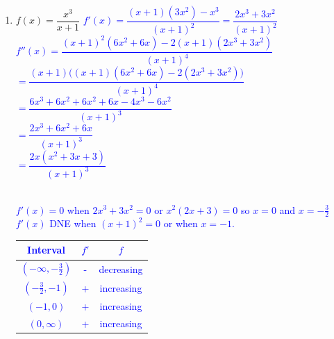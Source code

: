 \documentclass{ximera}
\begin{document}
\begin{exercise}
\begin{enumerate}
    \item $f(x)=\dfrac{x^3}{x+1}$
    \textcolor{blue}{$f'(x)=\dfrac{(x+1)(3x^2)-x^3}{(x+1)^2}=\dfrac{2x^3+3x^2}{(x+1)^2}$\\
    $f''(x)=\dfrac{(x+1)^2(6x^2+6x)-2(x+1)(2x^3+3x^2)}{(x+1)^4}$\\
    $=\dfrac{(x+1)\big((x+1)(6x^2+6x)-2(2x^3+3x^2)\big)}{(x+1)^4}$\\
    $=\dfrac{6x^3+6x^2+6x^2+6x-4x^3-6x^2}{(x+1)^3}$\\
    $=\dfrac{2x^3+6x^2+6x}{(x+1)^3}$\\
    $=\dfrac{2x(x^2+3x+3)}{(x+1)^3}$\\}
    \\
    \textcolor{blue}{
    $f'(x)=0$ when $2x^3+3x^2=0$ or $x^2(2x+3)=0$ so $x=0$ and $x=-\frac{3}{2}$\\
    $f'(x)$ DNE when $(x+1)^2=0$ or when $x=-1$.\\
    \begin{tabular}{c|c|c}
        Interval & $f'$ & $f$\\ \hline
       $(-\infty,-\frac32)$  & - & decreasing  \\
       $(-\frac32,-1)$ & + & increasing \\
       $(-1, 0)$ & + & increasing \\
       $(0,\infty)$ & + & increasing
    \end{tabular}}
    

\end{enumerate}
\end{exercise}
\end{document}
